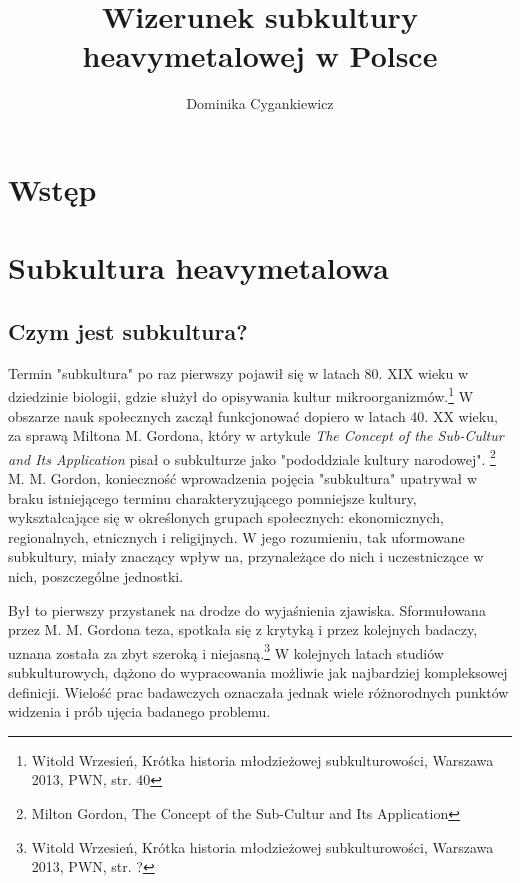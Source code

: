 \documentclass[12pt, a4paper, titlepage]{report}
\title{\textbf{Wizerunek subkultury heavymetalowej \break w Polsce}}
\author{Dominika Cygankiewicz}
\date{}
\begin{document}
	
\maketitle
\tableofcontents
\thispagestyle {empty}
\newpage

\chapter*{Wstęp}

\chapter{Subkultura heavymetalowa}
\section{Czym jest subkultura?}
Termin "subkultura" po raz pierwszy pojawił się w latach 80. XIX wieku w dziedzinie biologii, gdzie służył do opisywania kultur mikroorganizmów.\footnote{Witold Wrzesień, Krótka historia młodzieżowej subkulturowości, Warszawa 2013, PWN, \break str. 40} W obszarze nauk społecznych zaczął funkcjonować dopiero w latach 40. XX wieku, za sprawą Miltona M. Gordona, który w artykule \textit{The Concept of the Sub-Cultur and Its Application} pisał o subkulturze jako "pododdziale kultury narodowej". \footnote{Milton Gordon, The Concept of the Sub-Cultur and Its Application} M. M. Gordon, konieczność wprowadzenia pojęcia "subkultura" upatrywał w braku istniejącego terminu charakteryzującego pomniejsze kultury, wykształcające się w określonych grupach społecznych: ekonomicznych, regionalnych, etnicznych i religijnych. W jego rozumieniu, tak uformowane subkultury, miały znaczący wpływ na, przynależące do nich i uczestniczące w nich, poszczególne jednostki.\footnotemark[\value{footnote}] %


Był to pierwszy przystanek na drodze do wyjaśnienia zjawiska. Sformułowana przez M. M. Gordona teza, spotkała się z krytyką i przez kolejnych badaczy, uznana została za zbyt szeroką i niejasną.\footnote{Witold Wrzesień, Krótka historia młodzieżowej subkulturowości, Warszawa 2013, PWN, \break str. ?} W kolejnych latach studiów subkulturowych, dążono do wypracowania możliwie jak najbardziej kompleksowej definicji. Wielość prac badawczych oznaczała jednak wiele różnorodnych punktów widzenia i prób ujęcia badanego problemu. %
\end{document}
